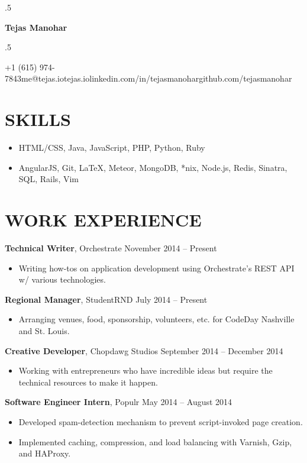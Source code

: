\documentclass{res}
\newcommand*{\its}{\hspace{0.8cm}}
\begin{document}
\moveleft.5\hoffset\centerline{\Huge\bf Tejas Manohar}
\bigskip
\moveleft.5\hoffset\centerline{+1 (615) 974-7843\its{}me@tejas.io\its{}\its{}tejas.io\its{}linkedin.com/in/tejasmanohar\its{}github.com/tejasmanohar}

\section{SKILLS}

\begin{itemize} \itemsep -2pt
  \item HTML/CSS, Java, JavaScript, PHP, Python, Ruby
  \item AngularJS, Git, \LaTeX, Meteor, MongoDB, *nix, Node.js, Redis, Sinatra, SQL, Rails, Vim
\end{itemize}

\section{WORK EXPERIENCE}

{\bf Technical Writer}, Orchestrate \hfill November 2014 -- Present
\begin{itemize} \itemsep -2pt
  \item Writing how-tos on application development using Orchestrate's REST API w/ various technologies.
\end{itemize}

{\bf Regional Manager}, StudentRND \hfill July 2014 -- Present
\begin{itemize} \itemsep -2pt
  \item Arranging venues, food, sponsorship, volunteers, etc. for CodeDay Nashville and St. Louis.
\end{itemize}

{\bf Creative Developer}, Chopdawg Studios \hfill September 2014 -- December 2014
\begin{itemize} \itemsep -2pt
  \item Working with entrepreneurs who have incredible ideas but require the technical resources to make it happen.
\end{itemize}

{\bf Software Engineer Intern}, Populr \hfill May 2014 -- August 2014
\begin{itemize} \itemsep -2pt
  \item Developed spam-detection mechanism to prevent script-invoked page creation.
  \item Implemented caching, compression, and load balancing with Varnish, Gzip, and HAProxy.
\end{itemize}
\end{document}
